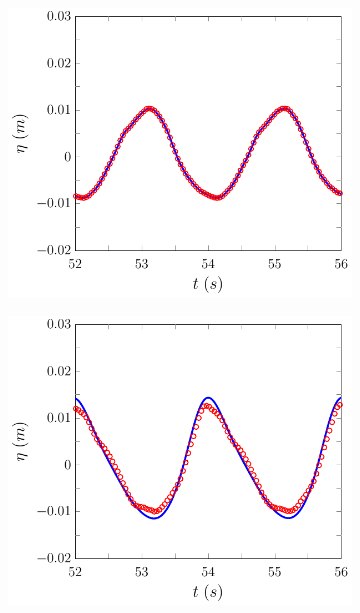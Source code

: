\begin{figure}
	\centering
	\begin{subfigure}{0.5\textwidth}
		\includegraphics[width=\textwidth]{./chp6/figures/Experiment/Beji/sl/FDVMWG1.pdf}
		\vspace{0.5cm}
	\end{subfigure}%
	\begin{subfigure}{0.5\textwidth}
		\includegraphics[width=\textwidth]{./chp6/figures/Experiment/Beji/sl/FDVMWG2.pdf}

\end{subfigure}
\end{figure}
